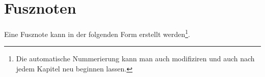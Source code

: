 %
\section{Fusznoten}\label{sec:fusznoten}
%
Eine Fusznote kann in der folgenden Form erstellt werden\footnote{Die automatische Nummerierung kann man auch modifiziren und auch nach jedem Kapitel neu beginnen lassen.}.
%
\newpage
%
